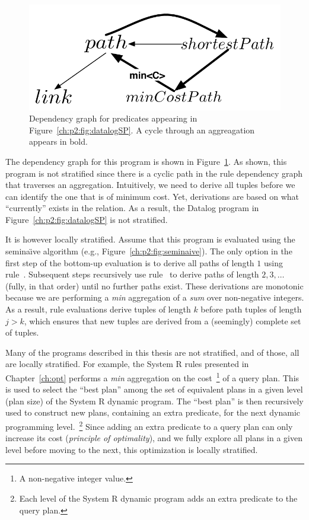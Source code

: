 \begin{figure} 
\ssp
\begin{center}
\includegraphics[scale=0.75]{figures/dependency-graph2}
\caption{\label{ch:p2:fig:dependency2}Dependency graph for predicates 
appearing in Figure~\ref{ch:p2:fig:datalogSP}. A cycle through an aggreagation
appears in bold. }
\end{center} 
\end{figure}

The dependency graph for this program is shown in
Figure~\ref{ch:p2:fig:dependency2}.  As shown, this program is not stratified
since there is a cyclic path in the rule dependency graph that traverses an
aggregation.  Intuitively, we need to derive all  tuples before we can
identify the one that is of minimum cost.  Yet,  derivations are based
on what ``currently'' exists in the  relation.  As a result,
the Datalog program in Figure~\ref{ch:p2:fig:datalogSP} is not stratified.

It is however locally stratified.  Assume that this program is evaluated using
the semina\"{\i}ve algorithm (e.g., Figure~\ref{ch:p2:fig:seminaive}).  The
only option in the first step of the bottom-up evaluation is to derive all
paths of length $1$ using rule~.  Subsequent steps recursively use
rule~ to derive paths of length $2, 3, \ldots$ (fully, in that order)
until no further paths exist.  These derivations are monotonic because we are
performing a {\em min} aggregation of a {\em sum} over non-negative integers.
As a result, rule evaluations derive  tuples of length $k$ before path
tuples of length $j > k$, which ensures that new  tuples are derived
from a (seemingly) complete set of  tuples.

Many of the programs described in this thesis are not stratified, and of those,
all are locally stratified.  For example, the System R rules presented in
Chapter~\ref{ch:opt} performs a {\em min} aggregation on the cost~\footnote{ A
non-negative integer value.} of a query plan.  This is used to select the
``best plan'' among the set of equivalent plans in a given level (plan size) of
the System R dynamic program.  The ``best plan'' is then recursively used to
construct new plans, containing an extra predicate, for the next dynamic
programming level.~\footnote{Each level of the System R dynamic program adds an
extra predicate to the query plan.}  Since adding an extra predicate to a
query plan can only increase its cost ({\em principle of optimality}), and we
fully explore all plans in a given level before moving to the next, this
optimization is locally stratified.


